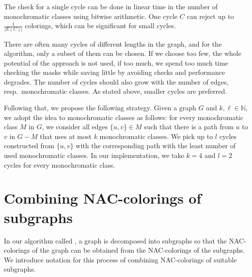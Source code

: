 The check for a single cycle can be done in linear time
in the number of monochromatic classes using bitwise arithmetic.
One cycle $C$ can reject up to $\frac{1}{|E(C)|}$ colorings,
which can be significant for small cycles.

There are often many cycles of different lengths in the graph,
and for the algorithm, only a subset of them can be chosen.
If we choose too few, the whole potential of the approach is not used, if too much,
we spend too much time checking the masks while saving little
by avoiding \IsNACColoring{} checks and performance degrades.
The number of cycles should also grow with the number of edges,
resp.\ monochromatic classes.
As stated above, smaller cycles are preferred.

Following that, we propose the following strategy.
Given a graph $G$ and $k,\ell\in \mathbb{N}$,
we adopt the idea to monochromatic classes as follows:
for every monochromatic class $M$ in $G$,
we consider all edges $\{u, v\} \in M$ such that there is a path from $u$ to $v$
in $G - M$ that uses at most $k$ monochromatic classes.
We pick up to $l$ cycles constructed from $\{u, v\}$ with the corresponding
path with the least number of used monochromatic classes.
In our implementation, we take $k=4$ and $l=2$ cycles for every monochromatic class.

\section{Combining NAC-colorings of subgraphs}%
\label{sec:combining}

In our algorithm called \Subgraphs{}, a graph is decomposed into subgraphs so that
the NAC-colorings of the graph can be obtained from the NAC-colorings of the subgraphs.
We introduce notation for this process of combining NAC-colorings of suitable subgraphs.


